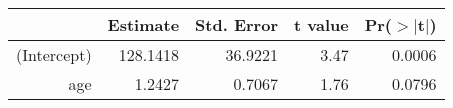 \begin{table}[ht]
\centering
\begin{tabular}{rrrrr}
  \hline
 & Estimate & Std. Error & t value & Pr($>$$|$t$|$) \\ 
  \hline
(Intercept) & 128.1418 & 36.9221 & 3.47 & 0.0006 \\ 
  age & 1.2427 & 0.7067 & 1.76 & 0.0796 \\ 
   \hline
\end{tabular}
\end{table}
